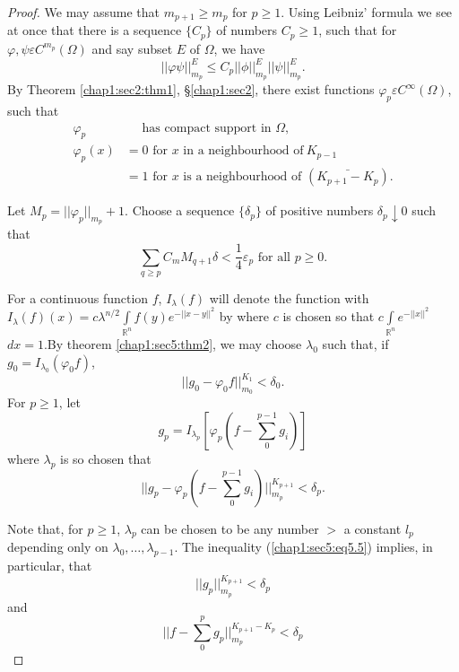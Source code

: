 \begin{proof}
  We may assume that $m_{ p +1} \geq m_p $ for $p \geq 1$. Using
  Leibniz' formula we see at once that there is a sequence $\{C_p\}$
  of numbers $C_p \geq 1$, such that for $\varphi, \psi  \varepsilon C^{m_p}
  (\Omega)$ and say subset $E$ of $\Omega$, we have  
  $$
  || \varphi \psi ||^E _{ m_p} \leq C_p || \phi ||^E_{m_p} ||  \psi ||^E_{m_p}. 
  $$
  By Theorem \ref{chap1:sec2:thm1}, \S \ref{chap1:sec2}, there exist
  functions $\varphi _p \varepsilon C^\infty (\Omega)$,  such that  
  \begin{align*}
      \varphi _p & \quad  \text{ has compact support in }\Omega,\\ 
    \varphi _p(x) & = 0 \text{ for $x$ in a neighbourhood of} ~K_{p -1} \\
    & = 1 \text{ for $x$ is a neighbourhood of }(\bar{ K_{p+1} - K_p}).
  \end{align*}

  Let $M_p = ||\varphi_p|| _{m_p} + 1$. Choose a sequence $\{\delta
  _p\}$ of positive numbers $\delta _p \downarrow 0$ such that  
  \begin{equation*}
    \sum_{q \geq p} C_m M_{ q  + 1} \delta < \frac{1}{4} \varepsilon
    _p \text{ for all } p \geq 0. \tag{5.4}\label{chap1:sec5:eq5.4}  
  \end{equation*}

  For a continuous function $f$, $I_\lambda (f)$ will  denote the
  function with $I_\lambda (f) (x) = c\lambda^{n/2}
  \int\limits_{\mathbb{R}^n} f(y) e^{ - || x - y ||^2}$ by where $c$ is chosen
  so that $c \int\limits_{ \mathbb{R}^n} e^{ - || x ||^2}$ $dx = 1$.\pageoriginale By
  theorem \ref{chap1:sec5:thm2}, we may choose $\lambda_0$ such that, if $g_0 = I
  _{\lambda _0} (\varphi _0 f)$,  
  $$
  || g_0 - \varphi_0 f ||^{K_1}_{m_0} < \delta _0.
  $$
  For $p \geq 1$, let 
  $$
  g_p = I_{ \lambda _p} \left[ \varphi _p \left(f - \sum^{ p - 1}_0g_i
    \right)\right]
  $$
  where $\lambda_p$ is so chosen that 
  \begin{equation*}
    || g_p -  \varphi _p \left( f - \sum^{ p - 1}_0 g_i\right) ||^{ K_{ p +1}}_{
      m_p} < \delta _p. \tag{5.5}\label{chap1:sec5:eq5.5}  
  \end{equation*}
  
  Note that, for $p \geq 1$, $\lambda _p$ can be chosen to be any number
  $ > $ a constant $l_p$ depending only on $\lambda _0, \ldots,
  \lambda_{p - 1}$. The inequality (\ref{chap1:sec5:eq5.5}) implies,
  in particular, that   
  \begin{equation*}
    || g_p || ^{ K_{ p+1}}_{m_p} < \delta _p \tag{5.6}\label{chap1:sec5:eq5.6}
  \end{equation*}
  and
  \begin{equation*}
    || f - \sum^p_0  g_p || ^{ K_{ p +1}- K_p}_{ m_p} < \delta _p
    \tag{5.7}\label{chap1:sec5:eq5.7}
  \end{equation*}
  

\end{proof}
